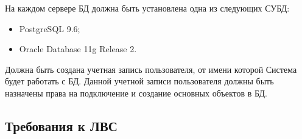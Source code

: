 На каждом сервере БД должна быть установлена одна из следующих СУБД:
\begin{itemize}
    \item PostgreSQL 9.6;
    \item Oracle Database 11g Release 2. %
\end{itemize}

Должна быть создана учетная запись пользователя, от имени которой Система будет работать с БД.
Данной учетной записи пользователя должны быть назначены права на подключение и создание основных объектов в БД.

%
%
%
%
%
%


\subsection{Требования к ЛВС}

